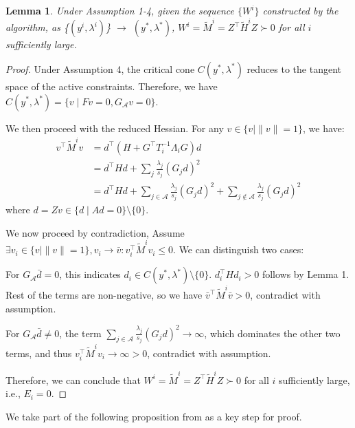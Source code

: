 \documentclass[conference]{IEEEtran}
\theoremstyle{plain}
\newtheorem{lemma}[theorem]{Lemma}
\begin{document}
\begin{lemma}
    Under Assumption 1-4, given the sequence $\{W^i\}$ constructed by the algorithm, as \{$(y^i, \lambda^i)$\} $\rightarrow$ $(y^*, \lambda^*)$,
    $W^i = \tilde{M}^i = Z^\top \tilde{H}^i Z \succ 0$ for all $i$ sufficiently large.
\end{lemma}

\begin{proof}
    Under Assumption 4, the critical cone $C(y^*,\lambda^*)$ reduces to the tangent space of the active constraints. 
    Therefore, we have $C(y^*,\lambda^*) = \{v \mid F v = 0 ,G_{\mathcal{A}} v = 0\}$.

    We then proceed with the reduced Hessian. For any $ v \in \{v \mid \|v\| = 1 \}$, we have:
    \begin{align*}
        v^\top \tilde{M}^i v &= d^\top (H + G^\top T_i^{-1} \Lambda_i  G) d \\
                             &= d^\top H d + \sum_{j} \frac{\lambda_j}{s_j} (G_j d)^2 \\
                             &= d^\top H d + \sum_{j \in \mathcal{A}} \frac{\lambda_j}{s_j} (G_j d)^2 + \sum_{j \notin \mathcal{A}} \frac{\lambda_j}{s_j} (G_j d)^2
    \end{align*}
    where $d = Zv \in \{d \mid Ad = 0\} \setminus \{0\}$. 

    We now proceed by contradiction, Assume $\exists v_i \in \{v \mid \|v\| = 1 \}, v_i \rightarrow \bar{v} : v_i^\top \tilde{M}^i v_i \leq 0$.
    We can distinguish two cases:

    For $G_{\mathcal{A}}\bar{d}=0$, this indicates $d_i \in C(y^*,\lambda^*) \setminus \{0\}$. $d_i^\top H d_i > 0$ follows by Lemma 1.
    Rest of the terms are non-negative, so we have $\bar{v}^\top \tilde{M}^i \bar{v}> 0$, contradict with assumption.

    For $G_{\mathcal{A}}\bar{d} \neq 0$, the term $\sum_{j \in \mathcal{A}} \frac{\lambda_j}{s_j} (G_j d)^2 \rightarrow \infty$, 
    which dominates the other two terms, and thus $v_i^\top \tilde{M}^i v_i \rightarrow \infty > 0$, contradict with assumption.

    Therefore, we can conclude that $W^i = \tilde{M}^i = Z^\top \tilde{H}^i Z \succ 0$ for all $i$ sufficiently large, i.e., $E_i=0$.
\end{proof}


We take part of the following proposition from \cite{titsSimpleQuadraticallyConvergent1994} as a key step for proof.
\end{document}
